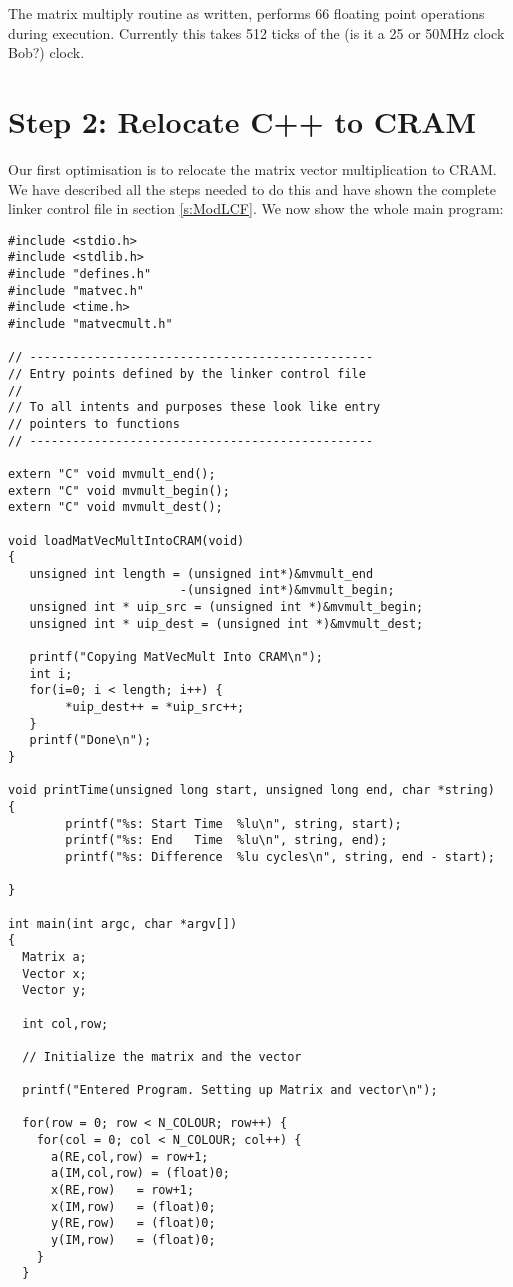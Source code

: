 The matrix multiply routine as written, performs 66 floating point
operations during execution. Currently this takes 512 ticks of the 
(is it a 25 or 50MHz clock Bob?) clock.

\section{Step 2: Relocate C++ to CRAM}
Our first optimisation is to relocate the matrix vector multiplication
to CRAM. We have described all the steps needed to do this and have
shown the complete linker control file in section \ref{s:ModLCF}. 
We now show the whole main program:
{\scriptsize
\begin{verbatim}
#include <stdio.h>
#include <stdlib.h>
#include "defines.h"
#include "matvec.h"
#include <time.h>
#include "matvecmult.h"

// ------------------------------------------------
// Entry points defined by the linker control file
//
// To all intents and purposes these look like entry
// pointers to functions
// ------------------------------------------------

extern "C" void mvmult_end();
extern "C" void mvmult_begin();
extern "C" void mvmult_dest();

void loadMatVecMultIntoCRAM(void)
{
   unsigned int length = (unsigned int*)&mvmult_end
                        -(unsigned int*)&mvmult_begin;
   unsigned int * uip_src = (unsigned int *)&mvmult_begin;
   unsigned int * uip_dest = (unsigned int *)&mvmult_dest;

   printf("Copying MatVecMult Into CRAM\n");
   int i;
   for(i=0; i < length; i++) {
        *uip_dest++ = *uip_src++;
   }   
   printf("Done\n");
}

void printTime(unsigned long start, unsigned long end, char *string)
{
        printf("%s: Start Time  %lu\n", string, start);
        printf("%s: End   Time  %lu\n", string, end);
        printf("%s: Difference  %lu cycles\n", string, end - start);

}

int main(int argc, char *argv[])
{
  Matrix a;
  Vector x;
  Vector y;

  int col,row;

  // Initialize the matrix and the vector

  printf("Entered Program. Setting up Matrix and vector\n");

  for(row = 0; row < N_COLOUR; row++) {
    for(col = 0; col < N_COLOUR; col++) {
      a(RE,col,row) = row+1;
      a(IM,col,row) = (float)0;
      x(RE,row)   = row+1;
      x(IM,row)   = (float)0;
      y(RE,row)   = (float)0;
      y(IM,row)   = (float)0;
    }
  }


\end{verbatim}}

